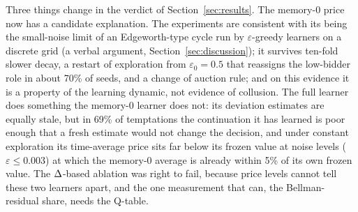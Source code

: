 Three things change in the verdict of Section~\ref{sec:results}. The memory-0 price now has a candidate explanation. The experiments are consistent with its being the small-noise limit of an Edgeworth-type cycle run by $\varepsilon$-greedy learners on a discrete grid (a verbal argument, Section~\ref{sec:discussion}); it survives ten-fold slower decay, a restart of exploration from $\varepsilon_0 = 0.5$ that reassigns the low-bidder role in about 70\% of seeds, and a change of auction rule; and on this evidence it is a property of the learning dynamic, not evidence of collusion. The full learner does something the memory-0 learner does not: its deviation estimates are equally stale, but in 69\% of temptations the continuation it has learned is poor enough that a fresh estimate would not change the decision, and under constant exploration its time-average price sits far below its frozen value at noise levels ($\varepsilon \leq 0.003$) at which the memory-0 average is already within 5\% of its own frozen value. The $\Delta$-based ablation was right to fail, because price levels cannot tell these two learners apart, and the one measurement that can, the Bellman-residual share, needs the Q-table.
